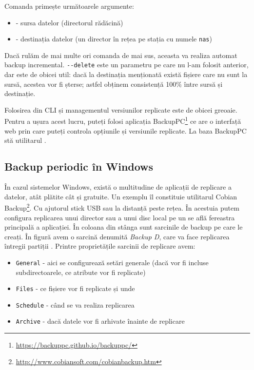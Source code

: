 Comanda  primește următoarele argumente:

\begin{itemize}
  \item \file{/} - sursa datelor (directorul rădăcină)
  \item {} - destinația datelor (un director în rețea pe
    stația cu numele \texttt{nas})
\end{itemize}


Dacă rulăm de mai multe ori comanda de mai sus, aceasta va realiza automat
backup incremental. \texttt{-{}-delete} este un parametru pe care nu l-am folosit
anterior, dar este de obicei util: dacă la destinația menționată există fișiere
care nu sunt la sursă, acestea vor fi șterse; astfel obținem consistență 100\%
între sursă și destinație.

Folosirea  din CLI și managementul versiunilor replicate este de obicei
greoaie. Pentru a ușura acest lucru, puteți folosi aplicația BackupPC\footnote{\url{https://backuppc.github.io/backuppc/}} ce are o interfață web prin care puteți
controla opțiunile și versiunile replicate. La baza BackupPC stă utilitarul
.

\subsection{Backup periodic în Windows}
\label{sec:storage:backup:windows}

În cazul sistemelor Windows, există o multitudine de aplicații de replicare a
datelor, atât plătite cât și gratuite. Un exemplu îl constituie utilitarul
Cobian Backup\footnote{\url{http://www.cobiansoft.com/cobianbackup.htm}}. Cu ajutorul
stick USB sau la distanță peste rețea. În
acestuia putem configura replicarea unui director sau a unui disc local pe un
 se află fereastra principală a
aplicației. În coloana din stânga sunt sarcinile de backup pe care le creați. În
figură avem o sarcină denumită \textit{Backup D}, care va face replicarea
întregii partiții . Printre proprietățile sarcinii de replicare avem:

\begin{itemize}
  \item \texttt{General} - aici se configurează setări generale (dacă vor fi
		incluse subdirectoarele, ce atribute vor fi replicate)
              \item \texttt{Files} - ce fișiere vor fi replicate și unde
              \item \texttt{Schedule} - când se va realiza replicarea
              \item \texttt{Archive} - dacă datele vor fi arhivate înainte de replicare
\end{itemize}

